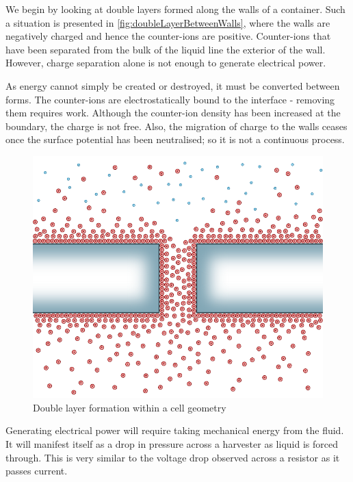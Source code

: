     We begin by looking at double layers formed along the walls of a container.
    Such a situation is presented in \ref{fig:doubleLayerBetweenWalls}, where the walls are negatively charged and hence the counter-ions are positive.
    Counter-ions that have been separated from the bulk of the liquid line the exterior of the wall.
    However, charge separation alone is not enough to generate electrical power.

    As energy cannot simply be created or destroyed, it must be converted between forms.
    The counter-ions are electrostatically bound to the interface - removing them requires work.
    Although the counter-ion density has been increased at the boundary, the charge is not free.
    Also, the migration of charge to the walls ceases once the surface potential has been neutralised; so it is not a continuous process.

    \begin{figure}
        \centering
        \includegraphics{content/pt1/01-PowerHarvesting/graphics/intro_2_channel}
        \caption{\label{fig:doubleLayerInChannel_noPressure}Double layer formation within a cell geometry}
    \end{figure}

    Generating electrical power will require taking mechanical energy from the fluid.
    It will manifest itself as a drop in pressure across a harvester as liquid is forced through.
    This is very similar to the voltage drop observed across a resistor as it passes current.

